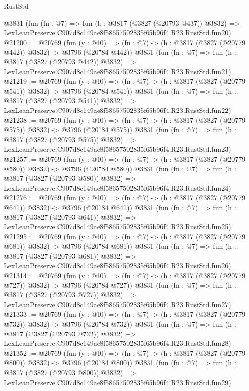 \begin{lexlean}{RustStd}
\begin{coremodule}
    @3831
    (fun (fn : @7) =>
    fun (h : @3817 (@3827 (@20793 @437)) @3832) =>
    LexLeanPreserve.C907d8c149ae8f58657502835f65b96f4.R23.RustStd.fun20)
@21200 := @20769
    (fun (y : @10) => (fn : @7) -> (h : @3817 (@3827 (@20779 @442)) @3832) -> @3796 (@20784 @442))
    @3831
    (fun (fn : @7) =>
    fun (h : @3817 (@3827 (@20793 @442)) @3832) =>
    LexLeanPreserve.C907d8c149ae8f58657502835f65b96f4.R23.RustStd.fun21)
@21219 := @20769
    (fun (y : @10) => (fn : @7) -> (h : @3817 (@3827 (@20779 @541)) @3832) -> @3796 (@20784 @541))
    @3831
    (fun (fn : @7) =>
    fun (h : @3817 (@3827 (@20793 @541)) @3832) =>
    LexLeanPreserve.C907d8c149ae8f58657502835f65b96f4.R23.RustStd.fun22)
@21238 := @20769
    (fun (y : @10) => (fn : @7) -> (h : @3817 (@3827 (@20779 @575)) @3832) -> @3796 (@20784 @575))
    @3831
    (fun (fn : @7) =>
    fun (h : @3817 (@3827 (@20793 @575)) @3832) =>
    LexLeanPreserve.C907d8c149ae8f58657502835f65b96f4.R23.RustStd.fun23)
@21257 := @20769
    (fun (y : @10) => (fn : @7) -> (h : @3817 (@3827 (@20779 @580)) @3832) -> @3796 (@20784 @580))
    @3831
    (fun (fn : @7) =>
    fun (h : @3817 (@3827 (@20793 @580)) @3832) =>
    LexLeanPreserve.C907d8c149ae8f58657502835f65b96f4.R23.RustStd.fun24)
@21276 := @20769
    (fun (y : @10) => (fn : @7) -> (h : @3817 (@3827 (@20779 @641)) @3832) -> @3796 (@20784 @641))
    @3831
    (fun (fn : @7) =>
    fun (h : @3817 (@3827 (@20793 @641)) @3832) =>
    LexLeanPreserve.C907d8c149ae8f58657502835f65b96f4.R23.RustStd.fun25)
@21295 := @20769
    (fun (y : @10) => (fn : @7) -> (h : @3817 (@3827 (@20779 @681)) @3832) -> @3796 (@20784 @681))
    @3831
    (fun (fn : @7) =>
    fun (h : @3817 (@3827 (@20793 @681)) @3832) =>
    LexLeanPreserve.C907d8c149ae8f58657502835f65b96f4.R23.RustStd.fun26)
@21314 := @20769
    (fun (y : @10) => (fn : @7) -> (h : @3817 (@3827 (@20779 @727)) @3832) -> @3796 (@20784 @727))
    @3831
    (fun (fn : @7) =>
    fun (h : @3817 (@3827 (@20793 @727)) @3832) =>
    LexLeanPreserve.C907d8c149ae8f58657502835f65b96f4.R23.RustStd.fun27)
@21333 := @20769
    (fun (y : @10) => (fn : @7) -> (h : @3817 (@3827 (@20779 @732)) @3832) -> @3796 (@20784 @732))
    @3831
    (fun (fn : @7) =>
    fun (h : @3817 (@3827 (@20793 @732)) @3832) =>
    LexLeanPreserve.C907d8c149ae8f58657502835f65b96f4.R23.RustStd.fun28)
@21352 := @20769
    (fun (y : @10) => (fn : @7) -> (h : @3817 (@3827 (@20779 @800)) @3832) -> @3796 (@20784 @800))
    @3831
    (fun (fn : @7) =>
    fun (h : @3817 (@3827 (@20793 @800)) @3832) =>
    LexLeanPreserve.C907d8c149ae8f58657502835f65b96f4.R23.RustStd.fun29)

\end{coremodule}
\end{lexlean}
